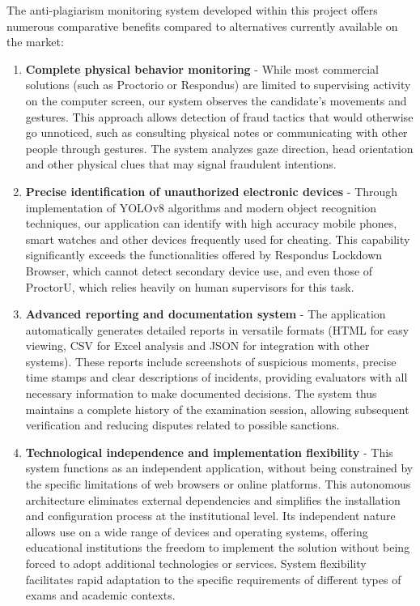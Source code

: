 \documentclass[12pt,a4paper]{article}
\begin{document}
The anti-plagiarism monitoring system developed within this project offers numerous comparative benefits compared to alternatives currently available on the market:

\begin{enumerate}
    \item \textbf{Complete physical behavior monitoring} - While most commercial solutions (such as Proctorio or Respondus) are limited to supervising activity on the computer screen, our system observes the candidate's movements and gestures. This approach allows detection of fraud tactics that would otherwise go unnoticed, such as consulting physical notes or communicating with other people through gestures. The system analyzes gaze direction, head orientation and other physical clues that may signal fraudulent intentions.
    
    \item \textbf{Precise identification of unauthorized electronic devices} - Through implementation of YOLOv8 algorithms and modern object recognition techniques, our application can identify with high accuracy mobile phones, smart watches and other devices frequently used for cheating. This capability significantly exceeds the functionalities offered by Respondus Lockdown Browser, which cannot detect secondary device use, and even those of ProctorU, which relies heavily on human supervisors for this task.
    
    \item \textbf{Advanced reporting and documentation system} - The application automatically generates detailed reports in versatile formats (HTML for easy viewing, CSV for Excel analysis and JSON for integration with other systems). These reports include screenshots of suspicious moments, precise time stamps and clear descriptions of incidents, providing evaluators with all necessary information to make documented decisions. The system thus maintains a complete history of the examination session, allowing subsequent verification and reducing disputes related to possible sanctions.
    
    \item \textbf{Technological independence and implementation flexibility} - This system functions as an independent application, without being constrained by the specific limitations of web browsers or online platforms. This autonomous architecture eliminates external dependencies and simplifies the installation and configuration process at the institutional level. Its independent nature allows use on a wide range of devices and operating systems, offering educational institutions the freedom to implement the solution without being forced to adopt additional technologies or services. System flexibility facilitates rapid adaptation to the specific requirements of different types of exams and academic contexts.
    

\end{enumerate}
\end{document}
